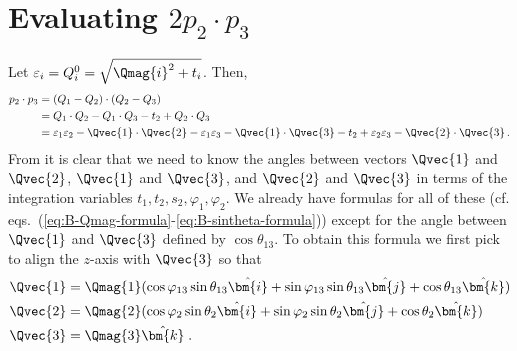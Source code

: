 \newcommand*{\sintheta}[2]{
    \sqrt{\frac{4 m_a^2 (-G_{#1})}{\lambda_{#1} \lambda_{#2}}}
}
\newcommand*{\costheta}[2]{
    \frac{\sqrt{\Lambda_{#1} \Lambda_{#2}} - 2 m_a^2 (t_{#1} + t_{#2} - m_{#2}^2)}{\sqrt{\lambda_{#1}\lambda_{#2}}}
}

\section{Evaluating $2 p_2 \cdot p_3$}
\label{app:2-dot-3}

Let $\varepsilon_i = Q_i^0 = \sqrt{\Qmag{i}^2 + t_i}$. Then,
\begin{equation}
    \label{eq:p2_dot_p3-Minkowski-dot-product}
    \begin{aligned}
        p_2 \cdot p_3 
        &=
            (Q_1 - Q_2)\cdot(Q_2 - Q_3)     \\
        &=
            Q_1 \cdot Q_2 - Q_1 \cdot Q_3 - t_2 + Q_2 \cdot Q_3 \\
        &= 
            \varepsilon_1 \varepsilon_2 - \Qvec{1}\cdot\Qvec{2}
        -
            \varepsilon_1 \varepsilon_3 - \Qvec{1}\cdot\Qvec{3}
        -
            t_2
        +
        \varepsilon_2 \varepsilon_3 - \Qvec{2}\cdot\Qvec{3} \, . 
    \end{aligned}
\end{equation}
From  it is clear that we need to know the angles between vectors $\Qvec{1}$ and $\Qvec{2}$, $\Qvec{1}$ and $\Qvec{3}$, and $\Qvec{2}$ and $\Qvec{3}$ in terms of the integration variables $t_1, t_2, s_2, \varphi_1, \varphi_2$. 
We already have formulas for all of these (cf. eqs.~(\ref{eq:B-Qmag-formula}-\ref{eq:B-sintheta-formula})) except for the angle between $\Qvec{1}$ and $\Qvec{3}$ defined by $\cos\theta_{13}$. 
To obtain this formula we first pick to align the $z$-axis with $\Qvec{3}$ so that
\begin{align}
    \Qvec{1} &= \Qmag{1} (\cos \varphi_{13} \sin \theta_{13} \hat{\bm{i}} + \sin \varphi_{13} \sin \theta_{13} \hat{\bm{j}} + \cos \theta_{13} \hat{\bm{k}}) \\
    \Qvec{2} &= \Qmag{2} (\cos \varphi_2 \sin \theta_2 \hat{\bm{i}} + \sin \varphi_2 \sin \theta_2 \hat{\bm{j}} + \cos \theta_2 \hat{\bm{k}}) \\
    \Qvec{3} &= \Qmag{3} \hat{\bm{k}} \; .
\end{align}

